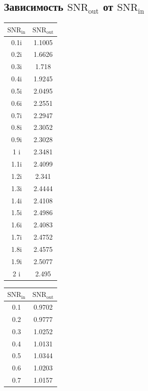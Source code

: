 \documentclass[12pt, a4paper] {ncc}
\begin{document}
    \subsection{Зависимость $\text{SNR}_{\text{out}}$ от $\text{SNR}_{\text{in}}$}
        \begin{table}[H]
            \begin{tabular} { |c|c| }
                \hline
					$\text{SNR}_\text{in}$ & $\text{SNR}_\text{out}$ \\ \hline
					0.1i &  1.1005 \\ \hline
					0.2i &  1.6626 \\ \hline
					0.3i &  1.718 \\ \hline
					0.4i &  1.9245 \\ \hline
					0.5i &  2.0495 \\ \hline
					0.6i &  2.2551 \\ \hline
					0.7i &  2.2947 \\ \hline
					0.8i &  2.3052 \\ \hline
					0.9i &  2.3028 \\ \hline
					1  i &  2.3481 \\ \hline
					1.1i &  2.4099 \\ \hline
					1.2i &  2.341 \\ \hline
					1.3i &  2.4444 \\ \hline
					1.4i &  2.4108 \\ \hline
					1.5i &  2.4986 \\ \hline
					1.6i &  2.4083 \\ \hline
					1.7i &  2.4752 \\ \hline
					1.8i &  2.4575 \\ \hline
					1.9i &  2.5077 \\ \hline
					2  i &  2.495 \\ \hline
			\end{tabular}
            \begin{tabular} { |c|c| }
                \hline
					$\text{SNR}_\text{in}$ & $\text{SNR}_\text{out}$ \\ \hline
						0.1 &  0.9702 \\ \hline
						0.2 &  0.9777 \\ \hline
						0.3 &  1.0252 \\ \hline
						0.4 &  1.0131 \\ \hline
						0.5 &  1.0344 \\ \hline
						0.6 &  1.0203 \\ \hline
						0.7 &  1.0157 \\ \hline

\end{tabular}
\end{table}
\end{document}

